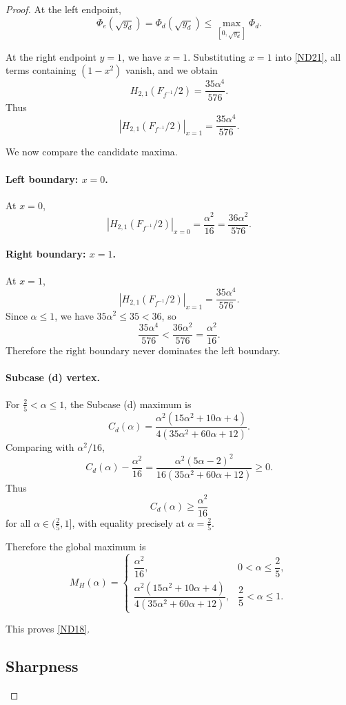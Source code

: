 \documentclass[10pt,a4paper]{amsart}
\numberwithin{equation}{section}
\begin{document}
\begin{proof}
At the left endpoint,
\[
\Phi_e(\sqrt{y_d})=\Phi_d(\sqrt{y_d})
\le
\max_{[0,\sqrt{y_d}]}\Phi_d.
\]

At the right endpoint $y=1$, we have $x=1$. Substituting $x=1$ into \eqref{ND21}, all terms containing $(1-x^2)$ vanish, and we obtain
\[
H_{2,1}\!\left(F_{f^{-1}}/2\right)
=
\frac{35\alpha^4}{576}.
\]
Thus
\begin{equation}\label{boundary_hankel_correct}
|H_{2,1}(F_{f^{-1}}/2)|_{x=1}
=
\frac{35\alpha^4}{576}.
\end{equation}

We now compare the candidate maxima.

\paragraph{Left boundary: $x=0$.}
At $x=0$,
\[
|H_{2,1}(F_{f^{-1}}/2)|_{x=0}
=
\frac{\alpha^2}{16}
=
\frac{36\alpha^2}{576}.
\]

\paragraph{Right boundary: $x=1$.}
At $x=1$,
\[
|H_{2,1}(F_{f^{-1}}/2)|_{x=1}
=
\frac{35\alpha^4}{576}.
\]
Since $\alpha\le 1$, we have $35\alpha^2\le 35<36$, so
\[
\frac{35\alpha^4}{576}
<
\frac{36\alpha^2}{576}
=
\frac{\alpha^2}{16}.
\]
Therefore the right boundary never dominates the left boundary.

\paragraph{Subcase (d) vertex.}
For $\frac25<\alpha\le 1$, the Subcase (d) maximum is
\[
C_d(\alpha)
=
\frac{\alpha^2(15\alpha^2+10\alpha+4)}{4(35\alpha^2+60\alpha+12)}.
\]
Comparing with $\alpha^2/16$,
\[
C_d(\alpha)-\frac{\alpha^2}{16}
=
\frac{\alpha^2(5\alpha-2)^2}
{16(35\alpha^2+60\alpha+12)}
\ge0.
\]
Thus
\[
C_d(\alpha)\ge \frac{\alpha^2}{16}
\]
for all $\alpha\in(\frac25,1]$, with equality precisely at $\alpha=\frac25$.

Therefore the global maximum is
\[
M_H(\alpha)
=
\begin{cases}
\dfrac{\alpha^2}{16}, & 0<\alpha\le \dfrac25,\\[8pt]
\dfrac{\alpha^2(15\alpha^2+10\alpha+4)}{4(35\alpha^2+60\alpha+12)}, & \dfrac25<\alpha\le 1.
\end{cases}
\]

This proves \eqref{ND18}.

\subsection*{Sharpness}


\end{proof}
\end{document}
